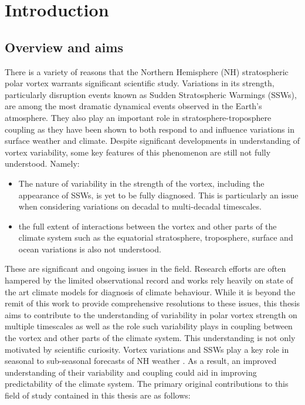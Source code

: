 \chapter{Introduction}
\label{cha:intro}

\section{Overview and aims}
\label{sec:overview}

There is a variety of reasons that the Northern Hemisphere (NH) stratospheric polar vortex warrants significant scientific study. Variations in its strength, particularly disruption events known as Sudden Stratospheric Warmings (SSWs), are among the most dramatic dynamical events observed in the Earth's atmosphere. They also play an important role in stratosphere-troposphere coupling as they have been shown to both respond to and influence variations in surface weather and climate. Despite significant developments in understanding of vortex variability, some key features of this phenomenon are still not fully understood. Namely: 

\begin{itemize}
    \item The nature of variability in the strength of the vortex, including the appearance of SSWs, is yet to be fully diagnosed. This is particularly an issue when considering variations on decadal to multi-decadal timescales.  
    
    \item the full extent of interactions between the vortex and other parts of the climate system such as the equatorial stratosphere, troposphere, surface and ocean variations is also not understood. 

\end{itemize}

These are significant and ongoing issues in the field. Research efforts are often hampered by the limited observational record and works rely heavily on state of the art climate models for diagnosis of climate behaviour. While it is beyond the remit of this work to provide comprehensive resolutions to these issues, this thesis aims to contribute to the understanding of variability in polar vortex strength on multiple timescales as well as the role such variability plays in coupling between the vortex and other parts of the climate system. This understanding is not only motivated by scientific curiosity. Vortex variations and SSWs play a key role in seasonal to sub-seasonal forecasts of NH weather \citep{Domeison2019, Domeison2019-2}. As a result, an improved understanding of their variability and coupling could aid in improving predictability of the climate system. The primary original contributions to this field of study contained in this thesis are as follows:

